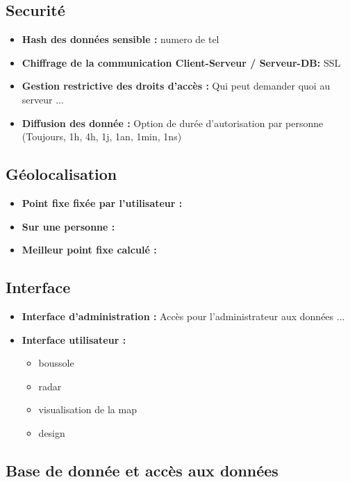 \documentclass[french]{article}
\begin{document}
		\subsection{Securité}
			\begin{itemize}
				\item \textbf{Hash des données sensible : } numero de tel
				\item \textbf{Chiffrage de la communication Client-Serveur / Serveur-DB: } SSL
				\item \textbf{ Gestion restrictive des droits d'accès : } Qui peut demander quoi au serveur ...
				\item \textbf{Diffusion des donnée : } Option de durée d'autorisation par personne (Toujours, 1h, 4h, 1j, 1an, 1min, 1ns)
			\end{itemize}
		\subsection{Géolocalisation}
			\begin{itemize}
				\item \textbf{Point fixe fixée par l'utilisateur : }
				\item \textbf{Sur une personne : }
				\item \textbf{Meilleur point fixe calculé : }
			\end{itemize}
			
		
		\subsection{Interface}
			\begin{itemize}
				\item \textbf{Interface d'administration : } Accès pour l'administrateur aux données ...
				\item \textbf{Interface utilisateur : }
				\begin{itemize}
					\item boussole
					\item radar
					\item visualisation de la map
					\item design 
				\end{itemize} 
			\end{itemize}
		
		\subsection{Base de donnée et accès aux données}
		
\end{document}
